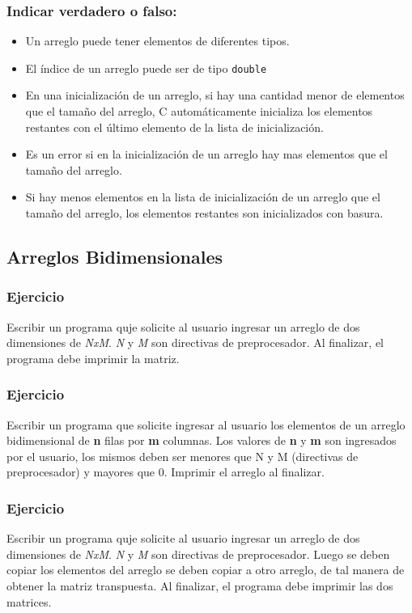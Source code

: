 \subsubsection{Indicar verdadero o falso:}
\begin{itemize}
  \item Un arreglo puede tener elementos de diferentes tipos.
  \item El índice de un arreglo puede ser de tipo \texttt{double}
  \item En una inicialización de un arreglo, si hay una cantidad menor de elementos que el tamaño del arreglo, C automáticamente inicializa los elementos restantes con el último elemento de la lista de inicialización.
  \item Es un error si en la inicialización de un arreglo hay mas elementos que el tamaño del arreglo.
  \item Si hay menos elementos en la lista de inicialización de un arreglo que el tamaño del arreglo, los elementos restantes son inicializados con basura.
\end{itemize}

\subsection*{Arreglos Bidimensionales}

\subsubsection{Ejercicio}
Escribir un programa quje solicite al usuario ingresar un arreglo de dos dimensiones de \textit{NxM}. \textit{N} y \textit{M} son directivas de preprocesador. Al finalizar, el programa debe imprimir la matriz.

\subsubsection{Ejercicio}
Escribir un programa que solicite ingresar al usuario los elementos de un arreglo bidimensional de \textbf{n} filas por  \textbf{m} columnas. Los valores de \textbf{n} y \textbf{m} son ingresados por el usuario, los mismos deben ser menores que N y M (directivas de preprocesador) y mayores que 0. Imprimir el arreglo al finalizar.

\subsubsection{Ejercicio}
Escribir un programa quje solicite al usuario ingresar un arreglo de dos dimensiones de \textit{NxM}. \textit{N} y \textit{M} son directivas de preprocesador. Luego se deben copiar los elementos del arreglo se deben copiar a otro arreglo, de tal manera de obtener la matriz transpuesta.
Al finalizar, el programa debe imprimir las dos matrices.


